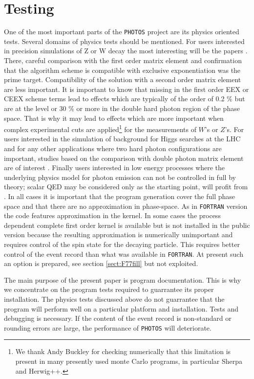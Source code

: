\documentclass[]{Photos_interface_design}
\begin{document}
\section{Testing}
\label{sec:tests} 
One of the most important parts of the {\tt PHOTOS} project are its physics oriented tests.
Several domains
of physics tests should be mentioned. For users interested in precision 
simulations of Z or W decay the most interesting will be the papers \cite{Nanava:2009vg,Golonka:2006tw}. There, careful comparison with the first order matrix element 
and confirmation that the algorithm scheme  is compatible with exclusive 
exponentiation was the prime target. Compatibility of the solution
with a second order matrix element are less important. 
It is important to know that missing in the first order EEX or CEEX \cite{koralz4:1994,kkcpc:1999} 
scheme terms
lead to effects which are typically of the order of 0.2 \% but are at the level 
or 30 \% or more in the double hard photon region of the phase space. That is 
why it may lead to effects which are more important when complex experimental 
cuts are applied\footnote{We thank Andy Buckley for checking numerically
 that this limitation is present in many presently used monte Carlo programs,
in particular Sherpa and Herwig++.  } 
for the measurements of $W$'s or $Z$'s.
For users interested in the simulation of
background for Higgs searches at the LHC and for any other applications where 
two hard photon configurations are important, studies based on the comparison with 
double photon matrix element are of 
interest \cite{Barberio:1993qi,RichterWas:1994ep,RichterWas:1993ta}.
Finally users interested in low energy processes where the underlying physics model 
for photon emission can not be controlled in full by theory; scalar QED may 
be considered only as the starting point, will profit 
from \cite{Nanava:2009vg,Nanava:2006vv}. In all cases it is important that
the  program generation cover the full phase space and that there are no 
approximation in phase-space. As in {\tt FORTRAN} version the code 
features approximation in the kernel. In some cases the process dependent 
complete first order 
kernel is available but is not installed in the public version  
because the resulting approximation is 
numerically unimportant and requires control of the spin state for the decaying 
particle. This requires better control of the event record than what was available 
in {\tt FORTRAN}. At present such an option is prepared, see section \ref{sect:F77fill} but not exploited. 

The main purpose of the present paper is program documentation. This is why
we concentrate on the program tests required to guarrantee its proper installation.
The physics tests discussed above 
do not guarrantee that the program will perform well on a particular platform and installation. Tests and debugging
is necessary.  If the content of the event record is non-standard or rounding errors are large, the performance of {\tt PHOTOS} will deteriorate.
\end{document}
